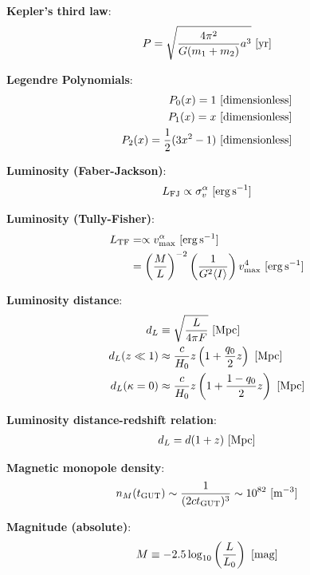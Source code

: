\documentclass[a4paper,11pt]{article}
\begin{document}
{\noindent}\textbf{Kepler's third law}:
\begin{align*}
    P = \sqrt{\frac{4\pi^2}{G(m_1+m_2)}a^3} ~ [{\rm yr}]
\end{align*}

{\noindent}\textbf{Legendre Polynomials}:
\begin{align*}
    P_0(x) = 1 ~ [{\rm dimensionless}] \\
    P_1(x) = x ~ [{\rm dimensionless}] \\
    P_2(x) = \frac{1}{2}(3x^2-1) ~ [{\rm dimensionless}]
\end{align*}

{\noindent}\textbf{Luminosity (Faber-Jackson)}:
\begin{align*}
    L_\mathrm{FJ} \propto \sigma_v^\alpha ~ [{\rm erg\,s^{-1}}]
\end{align*}

{\noindent}\textbf{Luminosity (Tully-Fisher)}:
\begin{align*}
    L_\mathrm{TF} &= \propto v_\mathrm{max}^\alpha ~ [{\rm erg\,s^{-1}}] \\
    &= \left(\frac{M}{L}\right)^{-2} \left(\frac{1}{G^2\langle I\rangle}\right)v_\mathrm{max}^4 ~ [{\rm erg\,s^{-1}}]
\end{align*}

{\noindent}\textbf{Luminosity distance}:
\begin{align*}
    d_L &\equiv \sqrt{\frac{L}{4\pi F}} ~ [{\rm Mpc}] \\
    d_L(z\ll1) &\approx \frac{c}{H_0}z\left(1+\frac{q_0}{2}z\right) ~ [{\rm Mpc}] \\
    d_L(\kappa=0) &\approx \frac{c}{H_0}z \left(1+\frac{1-q_0}{2}z\right) ~ [{\rm Mpc}]
\end{align*}

{\noindent}\textbf{Luminosity distance-redshift relation}:
\begin{align*}
    d_L = d(1+z) ~ [{\rm Mpc}]
\end{align*}

{\noindent}\textbf{Magnetic monopole density}:
\begin{align*}
    n_M(t_\mathrm{GUT}) \sim \frac{1}{(2ct_\mathrm{GUT})^3} \sim 10^{82} ~ [{\rm m^{-3}}]
\end{align*}

{\noindent}\textbf{Magnitude (absolute)}:
\begin{align*}
    M \equiv -2.5\log_{10}\left(\frac{L}{L_0}\right) ~ [{\rm mag}]
\end{align*}
\end{document}
